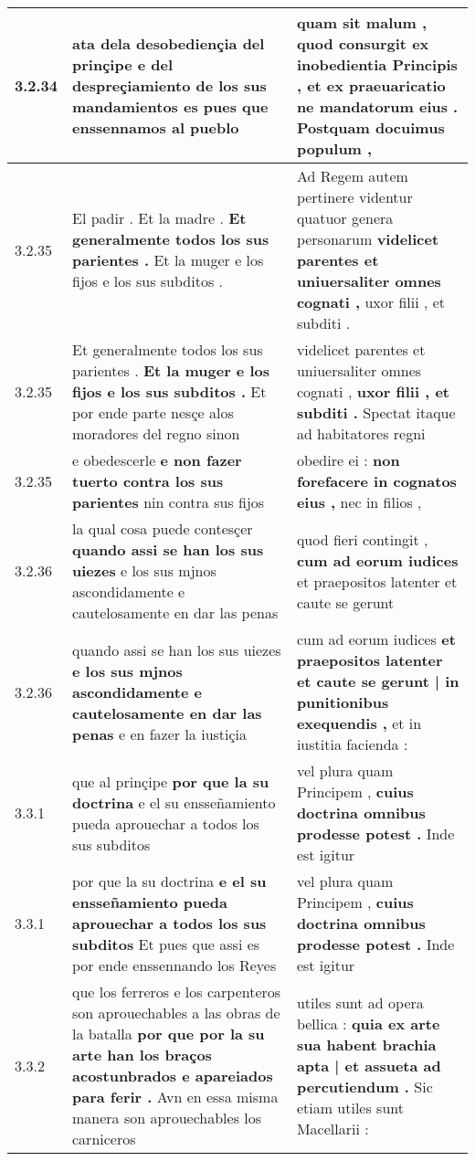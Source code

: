 \begin{tabular}{|p{1cm}|p{6.5cm}|p{6.5cm}|}
3.2.34 & ata dela desobediençia del prinçipe \textbf{ e del despreçiamiento de los sus mandamientos } es pues que enssennamos al pueblo & quam sit malum , quod consurgit ex inobedientia Principis , \textbf{ et ex praeuaricatio ne mandatorum eius . } Postquam docuimus populum , \\\hline
3.2.35 & El padir . Et la madre . \textbf{ Et generalmente todos los sus parientes . } Et la muger e los fijos e los sus subditos . & Ad Regem autem pertinere videntur quatuor genera personarum \textbf{ videlicet parentes et uniuersaliter omnes cognati , } uxor filii , et subditi . \\\hline
3.2.35 & Et generalmente todos los sus parientes . \textbf{ Et la muger e los fijos e los sus subditos . } Et por ende parte nesçe alos moradores del regno sinon & videlicet parentes et uniuersaliter omnes cognati , \textbf{ uxor filii , et subditi . } Spectat itaque ad habitatores regni \\\hline
3.2.35 & e obedescerle \textbf{ e non fazer tuerto contra los sus parientes } nin contra sus fijos & obedire ei : \textbf{ non forefacere in cognatos eius , } nec in filios , \\\hline
3.2.36 & la qual cosa puede contesçer \textbf{ quando assi se han los sus uiezes } e los sus mjnos ascondidamente e cautelosamente en dar las penas & quod fieri contingit , \textbf{ cum ad eorum iudices } et praepositos latenter et caute se gerunt \\\hline
3.2.36 & quando assi se han los sus uiezes \textbf{ e los sus mjnos ascondidamente e cautelosamente en dar las penas } e en fazer la iustiçia & cum ad eorum iudices \textbf{ et praepositos latenter et caute se gerunt | in punitionibus exequendis , } et in iustitia facienda : \\\hline
3.3.1 & que al prinçipe \textbf{ por que la su doctrina } e el su ensseñamiento pueda aprouechar a todos los sus subditos & vel plura quam Principem , \textbf{ cuius doctrina omnibus prodesse potest . } Inde est igitur \\\hline
3.3.1 & por que la su doctrina \textbf{ e el su ensseñamiento pueda aprouechar a todos los sus subditos } Et pues que assi es por ende enssennando los Reyes & vel plura quam Principem , \textbf{ cuius doctrina omnibus prodesse potest . } Inde est igitur \\\hline
3.3.2 & que los ferreros e los carpenteros son aprouechables a las obras de la batalla \textbf{ por que por la su arte han los braços acostunbrados e apareiados para ferir . } Avn en essa misma manera son aprouechables los carniceros & utiles sunt ad opera bellica : \textbf{ quia ex arte sua habent brachia apta | et assueta ad percutiendum . } Sic etiam utiles sunt Macellarii : \\\hline

\end{tabular}
